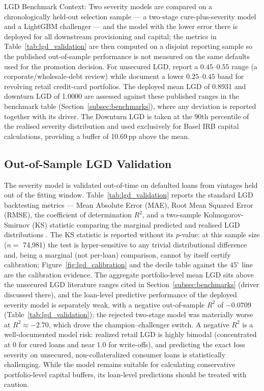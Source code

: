 \documentclass[11pt,a4paper]{article}
\begin{document}
LGD Benchmark Context: Two severity models are compared on a chronologically held-out selection sample --- a two-stage cure-plus-severity model and a LightGBM challenger --- and the model with the lower error there is deployed for all downstream provisioning and capital; the metrics in Table~\ref{tab:lgd_validation} are then computed on a disjoint reporting sample so the published out-of-sample performance is not measured on the same defaults used for the promotion decision. For unsecured LGD, \textcite{schuermann2004} report a $0.45$--$0.55$ range (a corporate/wholesale-debt review) while \textcite{bellotti2012} document a lower $0.25$--$0.45$ band for revolving retail credit-card portfolios. The deployed mean LGD of 0.8931 and downturn LGD of 1.0000 are assessed against these published ranges in the benchmark table (Section~\ref{subsec:benchmarks}), where any deviation is reported together with its driver. The Downturn LGD is taken at the 90th percentile of the realised severity distribution and used exclusively for Basel IRB capital calculations, providing a buffer of 10.69\,pp above the mean.

\subsection{Out-of-Sample LGD Validation}
The severity model is validated out-of-time on defaulted loans from vintages held out of the fitting window. Table~\ref{tab:lgd_validation} reports the standard LGD backtesting metrics --- Mean Absolute Error (MAE), Root Mean Squared Error (RMSE), the coefficient of determination $R^2$, and a two-sample Kolmogorov-Smirnov (KS) statistic comparing the marginal predicted and realised LGD distributions \parencite{loterman2012benchmarking}. The KS statistic is reported without its $p$-value: at this sample size ($n=$ 74,981) the test is hyper-sensitive to any trivial distributional difference and, being a marginal (not per-loan) comparison, cannot by itself certify calibration; Figure~\ref{fig:lgd_calibration} and the decile table against the $45^{\circ}$ line are the calibration evidence. The aggregate portfolio-level mean LGD sits above the unsecured LGD literature ranges cited in Section~\ref{subsec:benchmarks} (driver discussed there), and the loan-level predictive performance of the deployed severity model is separately weak, with a negative out-of-sample $R^2$ of $-0.0709$ (Table~\ref{tab:lgd_validation}); the rejected two-stage model was materially worse at $R^2 \approx -2.70$, which drove the champion--challenger switch. A negative $R^2$ is a well-documented model risk: realized retail LGD is highly bimodal (concentrated at 0 for cured loans and near 1.0 for write-offs), and predicting the exact loss severity on unsecured, non-collateralized consumer loans is statistically challenging. While the model remains suitable for calculating conservative portfolio-level capital buffers, its loan-level predictions should be treated with caution.
\end{document}
